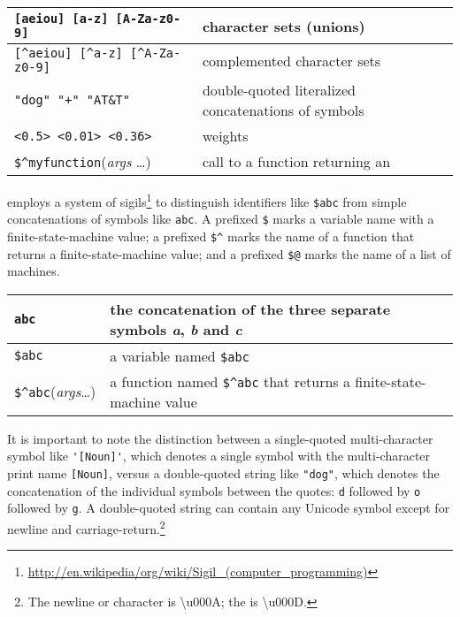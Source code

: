 \vspace{0.5cm}

\noindent
\begin{tabular}{|l|p{7.2cm}|}
\hline
\verb![aeiou] [a-z] [A-Za-z0-9]! & character sets (unions)\\
\hline
\verb![^aeiou] [^a-z] [^A-Za-z0-9]! & complemented character sets\\
\hline
\verb!"dog" "+" "AT&T"! & double-quoted literalized concatenations of symbols\\
\hline
\verb!<0.5> <0.01> <0.36>! &  weights\\
\hline
\verb!$^myfunction!(\textit{args} \ldots) & call to a function returning
an \fsm{}\\
\hline
\end{tabular}

\vspace{0.5cm}

\Kleene{} employs a system of
sigils\footnote{\url{http://en.wikipedia/org/wiki/Sigil_(computer_programming)}}
to distinguish identifiers like \verb!$abc! from simple concatenations of symbols 
like \verb!abc!.  A prefixed
\verb!$! marks a variable name with a finite-state-machine value; a prefixed
\verb!$^! marks the
name of a function that returns a finite-state-machine value; and a prefixed \verb!$@! marks the name of
a list of machines.

\vspace{0.5cm} 

\begin{center}
\begin{tabular}{|l|p{8cm}|}
\hline
\verb!abc! & the concatenation of the three separate symbols \emph{a}, \emph{b} and \emph{c} \\
\hline
\verb!$abc! & a variable named \verb!$abc! \\
\hline
\verb!$^abc!(\textit{args}\ldots{}) & a function named
\verb!$^abc! that returns a finite-state-machine value\\
\hline
\end{tabular}
\end{center}

\vspace{0.5cm}

It is important to note the distinction between a single-quoted
multi-character symbol like \verb!'[Noun]'!, which denotes a single
symbol with the multi-character print name \verb![Noun]!, versus a
double-quoted string like \verb!"dog"!, which denotes the concatenation of
the individual symbols between the quotes: \texttt{d} followed by \texttt{o} followed by
\texttt{g}.  A double-quoted string can
contain any Unicode  symbol except for newline and
carriage-return.\footnote{The newline or  character is
\textbackslash{}u000A; the  is
\textbackslash{}u000D.}

